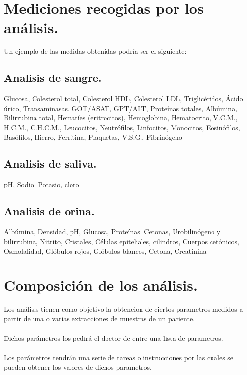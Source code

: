 \documentclass[a4paper,10pt]{article}
\begin{document}
\section{Mediciones recogidas por los análisis.}
Un ejemplo de las medidas obtenidas podría ser el siguiente:
\subsection{Analisis de sangre.}
Glucosa, Colesterol total, Colesterol HDL, Colesterol LDL, Triglicéridos, Ácido úrico, Transaminasas, GOT/ASAT, GPT/ALT, Proteínas totales, Albúmina, Bilirrubina total, Hematíes (eritrocitos), Hemoglobina, Hematocrito, V.C.M., H.C.M., C.H.C.M., Leucocitos, Neutrófilos, Linfocitos, Monocitos, Eosinófilos, Basófilos, Hierro, Ferritina, Plaquetas, V.S.G., Fibrinógeno \subsection{Analisis de saliva.}
pH, Sodio, Potasio, cloro
\subsection{Analisis de orina.}
Albúmina, Densidad, pH, Glucosa, Proteínas, Cetonas, Urobilinógeno y bilirrubina, Nitrito, Cristales, Células epiteliales, cilindros, Cuerpos cetónicos, Osmolalidad, Glóbulos rojos, Glóbulos blancos, Cetona, Creatinina
\pagebreak

\section{Composición de los análisis.}
\paragraph{}
Los análisis tienen como objetivo la obtencion de ciertos parametros medidos a partir de una o varias extracciones de muestras de un paciente.

\paragraph{}
Dichos parámetros los pedirá el doctor de entre una lista de parametros.

\paragraph{}
Los parámetros tendrán una serie de tareas o instrucciones por las cuales se pueden obtener los valores de dichos parametros.
\end{document}
